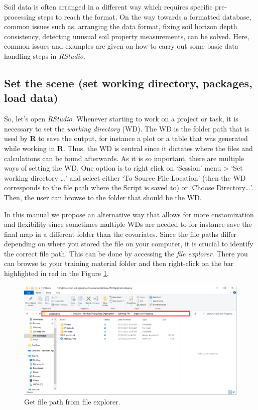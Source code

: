 \documentclass[
  10pt,
  b5paper,
  oneside]{book}
\begin{document}
Soil data is often arranged in a different way which requires specific pre-processing steps to reach the format. On the way towards a formatted database, common issues such as, arranging the data format, fixing soil horizon depth consistency, detecting unusual soil property measurements, can be solved. Here, common issues and examples are given on how to carry out some basic data handling steps in \emph{RStudio}.

\hypertarget{set-the-scene-set-working-directory-packages-load-data}{%
\subsection{Set the scene (set working directory, packages, load data)}\label{set-the-scene-set-working-directory-packages-load-data}}

So, let's open \emph{RStudio}. Whenever starting to work on a project or task, it is necessary to set the \emph{working directory} (WD). The WD is the folder path that is used by \textbf{R} to save the output, for instance a plot or a table that was generated while working in \textbf{R}. Thus, the WD is central since it dictates where the files and calculations can be found afterwards. As it is so important, there are multiple ways of setting the WD.
One option is to right click on `Session' menu \textgreater{} `Set working directory \ldots{}' and select either `To Source File Location' (then the WD corresponds to the file path where the Script is saved to) or `Choose Directory\ldots{}'. Then, the user can browse to the folder that should be the WD.

In this manual we propose an alternative way that allows for more customization and flexibility since sometimes multiple WDs are needed to for instance save the final map in a different folder than the covariates. Since the file paths differ depending on where you stored the file on your computer, it is crucial to identify the correct file path. This can be done by accessing the \emph{file explorer}. There you can browse to your training material folder and then right-click on the bar highlighted in red in the Figure \ref{fig:explorer}.

\begin{figure}
\includegraphics[width=17.42in]{images/file-explorer} \caption{Get file path from file explorer.}\label{fig:explorer}
\end{figure}
\end{document}
